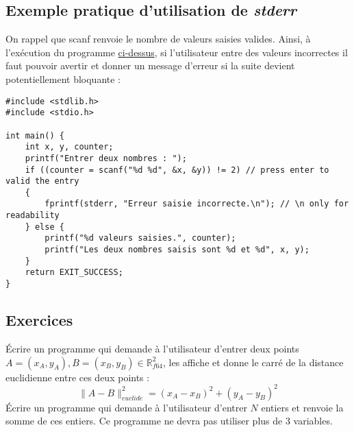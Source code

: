 \documentclass[../../../main.tex]{subfiles}
\begin{document}
\subsection{Exemple pratique d'utilisation de \textit{stderr}}
On rappel que \textsf{scanf} renvoie le nombre de valeurs saisies valides. Ainsi, à l'exécution du programme \hyperref[lst:prgm1]{ci-dessus}{}, si l'utilisateur entre des valeurs incorrectes il faut pouvoir avertir et donner un message d'erreur si la suite devient potentiellement bloquante :
	\begin{verbatim}
#include <stdlib.h>
#include <stdio.h>

int main() {
	int x, y, counter;
	printf("Entrer deux nombres : ");
	if ((counter = scanf("%d %d", &x, &y)) != 2) // press enter to valid the entry
	{
		fprintf(stderr, "Erreur saisie incorrecte.\n"); // \n only for readability
	} else {
		printf("%d valeurs saisies.", counter);
		printf("Les deux nombres saisis sont %d et %d", x, y);
	}
	return EXIT_SUCCESS;
}
	\end{verbatim}
\subsection{Exercices}
Écrire un programme qui demande à l'utilisateur d'entrer deux points $A = (x_{A}, y_{A}), B = (x_{B}, y_{B})\in{\mathbb{R}_{f64}^{2}}$, les affiche et donne le carré de la distance euclidienne entre ces deux points :
$$\lVert{A - B}\rVert^{2}_{euclide} = (x_{A} - x_{B})^{2} + (y_{A} - y_{B})^{2}$$
Écrire un programme qui demande à l'utilisateur d'entrer $N$ entiers et renvoie la somme de ces entiers. Ce programme ne devra pas utiliser plus de 3 variables.
\end{document}
